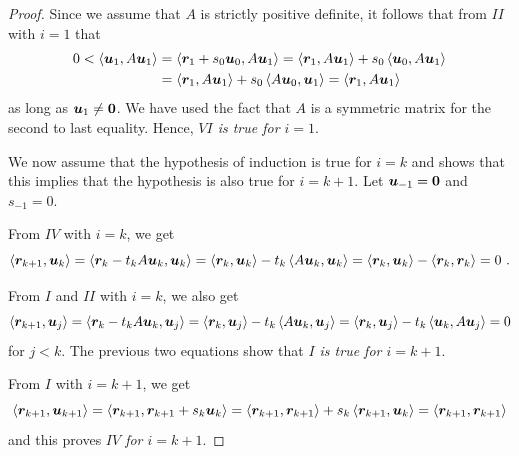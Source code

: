 \begin{proof}
Since we assume that $A$ is strictly positive definite, it follows
that from $II$ with $i=1$ that
\begin{align*}
0 < \left\langle{\bm{u}_1} , {A\bm{u}_1}\right\rangle
& = \left\langle{\bm{r}_1 + s_0 \bm{u}_0} , {A\bm{u}_1}\right\rangle
= \left\langle{\bm{r}_1} , {A\bm{u}_1}\right\rangle + s_0 \left\langle{\bm{u}_0} , {A\bm{u}_1}\right\rangle \\
& = \left\langle{\bm{r}_1} , {A\bm{u}_1}\right\rangle + s_0 \left\langle{A\bm{u}_0} , {\bm{u}_1}\right\rangle
= \left\langle{\bm{r}_1} , {A\bm{u}_1}\right\rangle
\end{align*}
as long as $\bm{u}_1 \neq \bm{0}$.  We have used the fact that $A$
is a symmetric matrix for the second to last equality.  Hence,
{\em $VI$ is true for $i=1$}.


We now assume that the hypothesis of induction is true for $i=k$ and
shows that this implies that the hypothesis is also true for $i=k+1$.
Let $\bm{u}_{-1} = \bm{0}$ and $s_{-1} = 0$.

From $IV$ with $i=k$, we get
\[
\ps{\VEC{r}_{k+1}}{\VEC{u}_k} = \ps{\VEC{r}_k - t_k A \VEC{u}_k}{\VEC{u}_k}
= \ps{\VEC{r}_k}{\VEC{u}_k} - t_k \ps{A\VEC{u}_k}{\VEC{u}_k}
= \ps{\VEC{r}_k}{\VEC{u}_k} - \ps{\VEC{r}_k}{\VEC{r}_k} = 0 \ .
\]

From $I$ and $II$ with $i=k$, we also get
\[
\left\langle{\bm{r}_{k+1}} , {\bm{u}_j}\right\rangle = \left\langle{\bm{r}_k - t_k A \bm{u}_k} , {\bm{u}_j}\right\rangle
= \left\langle{\bm{r}_k} , {\bm{u}_j}\right\rangle - t_k \left\langle{A\bm{u}_k} , {\bm{u}_j}\right\rangle
= \left\langle{\bm{r}_k} , {\bm{u}_j}\right\rangle - t_k \left\langle{\bm{u}_k} , {A\bm{u}_j}\right\rangle = 0
\]
for $j<k$.  The previous two equations show that
{\em $I$ is true for $i=k+1$}.

From $I$ with $i=k+1$, we get
\[
\left\langle{\bm{r}_{k+1}} , {\bm{u}_{k+1}}\right\rangle
= \left\langle{\bm{r}_{k+1}} , {\bm{r}_{k+1} + s_k\bm{u}_k}\right\rangle
= \left\langle{\bm{r}_{k+1}} , {\bm{r}_{k+1}}\right\rangle + s_k \left\langle{\bm{r}_{k+1}} , {\bm{u}_k}\right\rangle
= \left\langle{\bm{r}_{k+1}} , {\bm{r}_{k+1}}\right\rangle
\]
and this proves {\em $IV$ for $i=k+1$}.


\end{proof}
